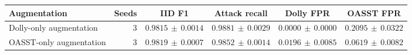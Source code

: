\begin{tabular}{@{}lrcccc@{}}
\toprule
Augmentation & Seeds & IID F1 & Attack recall & Dolly FPR & OASST FPR \\
\midrule
Dolly-only augmentation & 3 & $0.9815\,\pm\,0.0014$ & $0.9881\,\pm\,0.0029$ & $0.0000\,\pm\,0.0000$ & $0.2095\,\pm\,0.0322$ \\
OASST-only augmentation & 3 & $0.9819\,\pm\,0.0007$ & $0.9852\,\pm\,0.0014$ & $0.0196\,\pm\,0.0085$ & $0.0619\,\pm\,0.0082$ \\
\bottomrule
\end{tabular}
